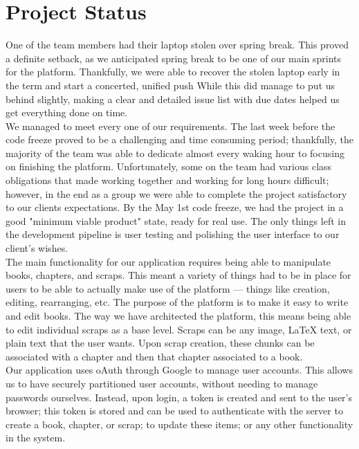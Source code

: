 \documentclass[onecolumn, draftclsnofoot,10pt, compsoc]{IEEEtran}
\begin{document}
\newpage

\section{Project Status}

\noindent
One of the team members had their laptop stolen over spring break. This proved a definite setback,
as we anticipated spring break to be one of our main sprints for the platform. Thankfully,
we were able to recover the stolen laptop early in the term and start a concerted, unified push
While this did manage to put us behind slightly, making a clear and detailed issue list
with due dates helped us get everything done on time. \\

\noindent We managed to meet every one of our requirements.
The last week before the code freeze proved to be a challenging and time
consuming period; thankfully, the majority of the team was able to dedicate almost every waking hour to focusing
on finishing the platform. Unfortunately, some on the team had various class obligations that made working
together and working for long hours difficult; however, in the end as a group we
were able to complete the project satisfactory to our clients expectations.
By the May 1st code freeze, we had the project in a good "minimum viable product" state, ready for real use.
The only things left in the development pipeline is user testing and polishing the user interface
to our client's wishes. \\

\noindent The main functionality for our application requires being able to manipulate books,
chapters, and scraps. This meant a variety of things had to be in place for users to be able to
actually make use of the platform --- things like creation, editing, rearranging, etc.
The purpose of the platform is to make it easy to write and edit books.
The way we have architected the platform, this means being able to edit individual scraps as a base level.
Scraps can be any image, LaTeX text, or plain text that the user wants. Upon scrap creation,
these chunks can be associated with a chapter and then that chapter associated to a book. \\

\noindent Our application uses oAuth through Google to manage user accounts. This allows
us to have securely partitioned user accounts, without needing to manage passwords ourselves.
Instead, upon login, a token is created and sent to the user's browser; this token is stored
and can be used to authenticate with the server to create a book, chapter, or scrap; to update
these items; or any other functionality in the system. \\
\end{document}
